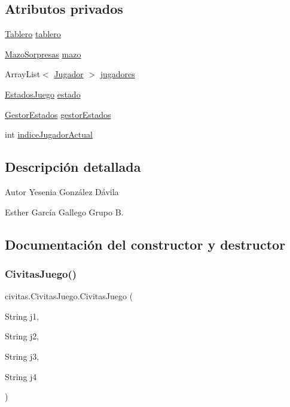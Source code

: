 \subsection*{Atributos privados}
\begin{DoxyCompactItemize}
\item 
\hyperlink{classcivitas_1_1Tablero}{Tablero} \hyperlink{classcivitas_1_1CivitasJuego_a826db446a6b18c2d6b5dc12a97aeed5f}{tablero}
\item 
\hyperlink{classcivitas_1_1MazoSorpresas}{Mazo\+Sorpresas} \hyperlink{classcivitas_1_1CivitasJuego_a5e4c8b521eaa77f8b3ee7a011292bf44}{mazo}
\item 
Array\+List$<$ \hyperlink{classcivitas_1_1Jugador}{Jugador} $>$ \hyperlink{classcivitas_1_1CivitasJuego_a144695f2b0b3bcaa51834b185ac7f967}{jugadores}
\item 
\hyperlink{enumcivitas_1_1EstadosJuego}{Estados\+Juego} \hyperlink{classcivitas_1_1CivitasJuego_a3a4c238acfdb2b2dd9018e8dccbde067}{estado}
\item 
\hyperlink{classcivitas_1_1GestorEstados}{Gestor\+Estados} \hyperlink{classcivitas_1_1CivitasJuego_af6232f29a5d1bf21e614adb7d81e89c9}{gestor\+Estados}
\item 
int \hyperlink{classcivitas_1_1CivitasJuego_a02802c9e7dcf8c52631fac46005c7080}{indice\+Jugador\+Actual}
\end{DoxyCompactItemize}


\subsection{Descripción detallada}
\begin{DoxyAuthor}{Autor}
Yesenia González Dávila 

Esther García Gallego Grupo B. 
\end{DoxyAuthor}


\subsection{Documentación del constructor y destructor}
\mbox{\label{classcivitas_1_1CivitasJuego_a4b26ce50375c0e4e4df6754c6f96fbbb}} 
\subsubsection{\texorpdfstring{Civitas\+Juego()}{CivitasJuego()}}
{\footnotesize\ttfamily civitas.\+Civitas\+Juego.\+Civitas\+Juego (\begin{DoxyParamCaption}\item[{String}]{j1,  }\item[{String}]{j2,  }\item[{String}]{j3,  }\item[{String}]{j4 }\end{DoxyParamCaption})\hspace{0.3cm}{\ttfamily [inline]}}



